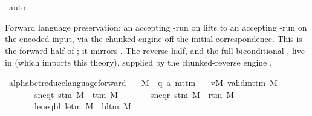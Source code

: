 \begin{isabellebody}
\ auto\isanewline
{}\isamarkupfalse%
%
\endisatagproof
{\isafoldproof}%
%
\isadelimproof
%
\endisadelimproof
%
\begin{isamarkuptext}%
Forward language preservation: an accepting -run on
   lifts to an accepting -run on the encoded
  input, via the chunked engine off the initial correspondence.
  This is the forward half of ;
  it mirrors .  The reverse
  half, and the full biconditional ,
  live in  (which imports this
  theory), supplied by the chunked-reverse engine
  .%
\end{isamarkuptext}\isamarkuptrue%
\isamarkupfalse%
\ alphabet{\isacharunderscore}{\kern0pt}reduce{\isacharunderscore}{\kern0pt}language{\isacharunderscore}{\kern0pt}forward{\isacharcolon}{\kern0pt}\isanewline
\ \ \ M\ {\isacharcolon}{\kern0pt}{\isacharcolon}{\kern0pt}\ {\isachardoublequoteopen}{\isacharparenleft}{\kern0pt}{\isacharprime}{\kern0pt}q{\isacharcomma}{\kern0pt}\ {\isacharprime}{\kern0pt}a{\isacharparenright}{\kern0pt}\ mttm{\isachardoublequoteclose}\isanewline
\ \ \ vM{\isacharcolon}{\kern0pt}\ {\isachardoublequoteopen}valid{\isacharunderscore}{\kern0pt}mttm\ M{\isachardoublequoteclose}\isanewline
\ \ \ \ \ \ \ s{\isacharunderscore}{\kern0pt}neq{\isacharunderscore}{\kern0pt}t{\isacharcolon}{\kern0pt}\ {\isachardoublequoteopen}s{\isacharunderscore}{\kern0pt}tm\ M\ {\isasymnoteq}\ t{\isacharunderscore}{\kern0pt}tm\ M{\isachardoublequoteclose}\isanewline
\ \ \ \ \ \ \ s{\isacharunderscore}{\kern0pt}neq{\isacharunderscore}{\kern0pt}r{\isacharcolon}{\kern0pt}\ {\isachardoublequoteopen}s{\isacharunderscore}{\kern0pt}tm\ M\ {\isasymnoteq}\ r{\isacharunderscore}{\kern0pt}tm\ M{\isachardoublequoteclose}\isanewline
\ \ \ \ \ \ \ le{\isacharunderscore}{\kern0pt}neq{\isacharunderscore}{\kern0pt}bl{\isacharcolon}{\kern0pt}\ {\isachardoublequoteopen}le{\isacharunderscore}{\kern0pt}tm\ M\ {\isasymnoteq}\ bl{\isacharunderscore}{\kern0pt}tm\ M{\isachardoublequoteclose}\isanewline

\end{isabellebody}
